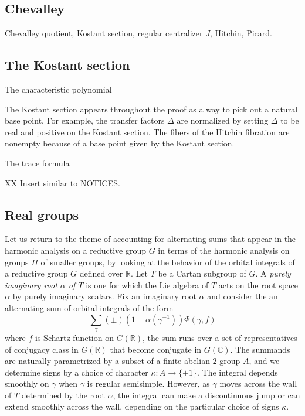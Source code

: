 \documentclass[brochure,english,12pt]{bourbaki}
\newcommand{\ring}[1]{\mathbb{#1}}
\begin{document}
\subsection{Chevalley}

Chevalley quotient, Kostant section, regular centralizer $J$, Hitchin, Picard.

\subsection{The Kostant section}

The characteristic polynomial

The Kostant section appears throughout the proof as a way to pick
out a natural base point.  For example, the transfer factors $\Delta$
are normalized by setting $\Delta$ to be real and positive on the
Kostant section.  The fibers of the Hitchin fibration are nonempty
because of a base point given by the Kostant section. 


The trace formula

XX Insert similar to NOTICES.

\subsection{Real groups}

Let us return to the theme of accounting for alternating sums that
appear in the harmonic analysis on a reductive group $G$ in terms of
the harmonic analysis on groups $H$ of smaller groups, by looking at
the behavior of the orbital integrals of a reductive group $G$ defined
over $\ring{R}$.  Let $T$ be a Cartan subgroup of $G$.  A {\it purely
  imaginary root $\alpha$ of $T$} is one for which the Lie algebra of $T$
acts on the root space $\alpha$ by purely imaginary scalars.
Fix an imaginary root $\alpha$ and
consider the an alternating sum of orbital integrals of the form
\[
\sum_\gamma (\pm) (1-\alpha(\gamma^{-1})) \Phi(\gamma,f)
\]
where $f$ is Schartz function on $G(\ring{R})$, the sum runs over a
set of representatives of conjugacy class in $G(\ring{R})$ that become
conjugate in $G(\ring{C})$.  The summands are naturally parametrized
by a subset of a finite abelian $2$-group $A$, and we determine signs
by a choice of character $\kappa:A\to \{ \pm1 \}$.  The integral
depends smoothly on $\gamma$ when $\gamma$ is regular semisimple.
However, as $\gamma$ moves across the wall of $T$ determined by the
root $\alpha$, the integral can make a discontinuous jump or can extend
smoothly across the wall, depending on the particular choice of signs
$\kappa$.  
\end{document}
